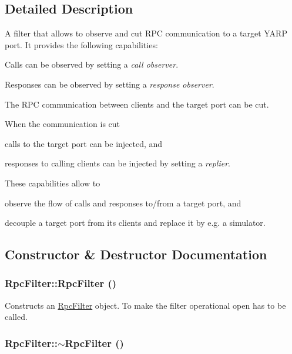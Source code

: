 \subsection{Detailed Description}
A filter that allows to observe and cut RPC communication to a target YARP port. It provides the following capabilities:
\begin{DoxyItemize}
\item Calls can be observed by setting a {\itshape call observer\/}.
\item Responses can be observed by setting a {\itshape response observer\/}.
\item The RPC communication between clients and the target port can be cut.
\item When the communication is cut
\begin{DoxyItemize}
\item calls to the target port can be injected, and
\item responses to calling clients can be injected by setting a {\itshape replier\/}.
\end{DoxyItemize}
\end{DoxyItemize}

These capabilities allow to
\begin{DoxyItemize}
\item observe the flow of calls and responses to/from a target port, and
\item decouple a target port from its clients and replace it by e.g. a simulator. 
\end{DoxyItemize}

\subsection{Constructor \& Destructor Documentation}
\hypertarget{classyarp_1_1os_1_1_rpc_filter_a6be8523a6258d84266a57734c907b70c}{
\subsubsection[{RpcFilter}]{\setlength{\rightskip}{0pt plus 5cm}RpcFilter::RpcFilter ()}}
\label{classyarp_1_1os_1_1_rpc_filter_a6be8523a6258d84266a57734c907b70c}
Constructs an {\ttfamily \hyperlink{classyarp_1_1os_1_1_rpc_filter}{RpcFilter}} object. To make the filter operational {\ttfamily open} has to be called. \hypertarget{classyarp_1_1os_1_1_rpc_filter_abcf7b927eb6c44e70087d44e72a9da52}{
\subsubsection[{$\sim$RpcFilter}]{\setlength{\rightskip}{0pt plus 5cm}RpcFilter::$\sim$RpcFilter ()}}
\label{classyarp_1_1os_1_1_rpc_filter_abcf7b927eb6c44e70087d44e72a9da52}


